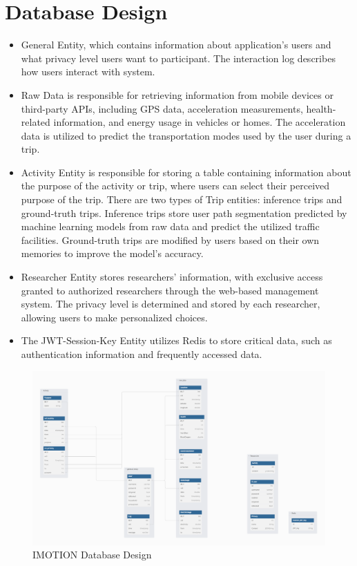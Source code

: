 \documentclass[12pt,two side]{report}
\begin{document}
\section{Database Design}
\begin{itemize}
    \item General Entity, which contains information about application's users and what privacy level users want to participant. The interaction log describes how users interact with system.
    \item Raw Data is responsible for retrieving information from mobile devices or third-party APIs, including GPS data, acceleration measurements, health-related information, and energy usage in vehicles or homes. The acceleration data is utilized to predict the transportation modes used by the user during a trip.
    \item Activity Entity is responsible for storing a table containing information about the purpose of the activity or trip, where users can select their perceived purpose of the trip. There are two types of Trip entities: inference trips and ground-truth trips. Inference trips store user path segmentation predicted by machine learning models from raw data and predict the utilized traffic facilities. Ground-truth trips are modified by users based on their own memories to improve the model's accuracy.
    \item Researcher Entity stores researchers' information, with exclusive access granted to authorized researchers through the web-based management system. The privacy level is determined and stored by each researcher, allowing users to make personalized choices.
    \item The JWT-Session-Key Entity utilizes Redis to store critical data, such as authentication information and frequently accessed data.
\end{itemize}
\begin{figure}
\centering
\includegraphics[width=12cm]{background_report/figures/database.png}
\caption{IMOTION Database Design}
\label{figure:6}
\end{figure}
\end{document}
